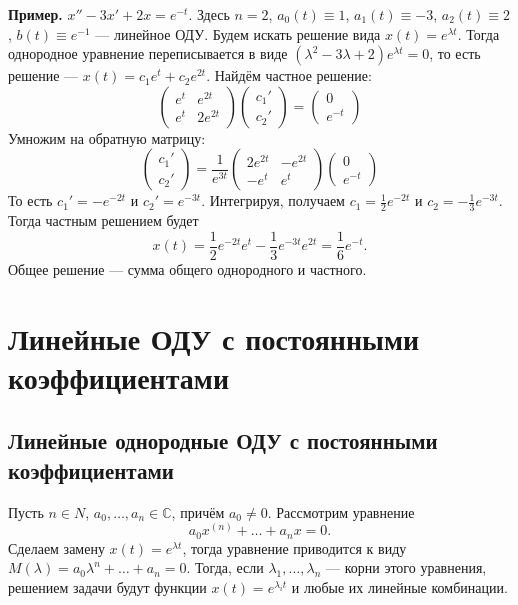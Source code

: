 \textbf{Пример.} $x'' - 3x' + 2x = e^{-t}$.
Здесь $n = 2$, $a_0(t) \equiv 1$, $a_1(t) \equiv -3$, $a_2(t) \equiv 2$, $b(t) \equiv e^{-1}$ --- линейное ОДУ.
Будем искать решение вида $x(t) = e^{\lambda t}$.
Тогда однородное уравнение переписывается в виде $(\lambda^2 - 3\lambda + 2) e^{\lambda t} = 0$, то есть решение --- $x(t) = c_1e^t + c_2 e^{2t}$.
Найдём частное решение:
\[
    \begin{pmatrix}
        e^t & e^{2t} \\
        e^t & 2e^{2t}
    \end{pmatrix}
    \begin{pmatrix}
        c_1' \\
        c_2'
    \end{pmatrix}
    =
    \begin{pmatrix}
        0 \\
        e^{-t}
    \end{pmatrix}
\]
Умножим на обратную матрицу:
\[
    \begin{pmatrix}
        c_1' \\
        c_2'
    \end{pmatrix}
    =
    \frac{1}{e^{3t}}
    \begin{pmatrix}
        2e^{2t} & -e^{2t} \\
        -e^t & e^t
    \end{pmatrix}
    \begin{pmatrix}
        0 \\
        e^{-t}
    \end{pmatrix}
\]
То есть $c_1' = -e^{-2t}$ и $c_2' = e^{-3t}$.
Интегрируя, получаем $c_1 = \frac{1}{2} e^{-2t}$ и $c_2 = -\frac{1}{3} e^{-3t}$.
Тогда частным решением будет
\[
    x(t) = \frac{1}{2} e^{-2t} e^t - \frac{1}{3} e^{-3t}e^{2t} = \frac{1}{6} e^{-t}.
\]
Общее решение --- сумма общего однородного и частного.

\setcounter{equation}{0}
\section{Линейные ОДУ с постоянными коэффициентами}
\subsection{Линейные однородные ОДУ с постоянными коэффициентами}
Пусть $n \in N$, $a_0, \dots, a_n \in \mathbb C$, причём $a_0 \ne 0$.
Рассмотрим уравнение 
\begin{equation}
    a_0 x^{(n)} + \dots + a_n x =0.
\end{equation}
Сделаем замену $x(t) = e^{\lambda t}$, тогда уравнение приводится к виду $M(\lambda) = a_0 \lambda^n + \dots + a_n = 0$.
Тогда, если $\lambda_1, \dots, \lambda_n$ --- корни этого уравнения, решением задачи будут функции $x(t) = e^{\lambda_i t}$ и любые их линейные комбинации.

